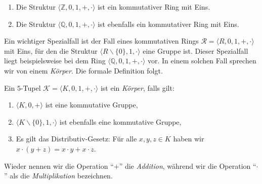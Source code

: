 \examples
\begin{enumerate}
\item Die Struktur $\langle \mathbb{Z}, 0, 1, +, \cdot \rangle$ ist ein kommutativer
      Ring mit  Eins.  
\item Die Struktur $\langle \mathbb{Q}, 0, 1, +, \cdot \rangle$ ist ebenfalls ein kommutativer Ring mit
      Eins.   \eoxs
\end{enumerate}

\begin{center}
\colorbox{red}{}
\end{center}

Ein wichtiger Spezialfall ist der Fall eines kommutativen Rings 
$\mathcal{R} = \langle R, 0, 1, +, \cdot \rangle$ mit Eins, 
f\"{u}r den die Struktur $\langle R \backslash \{0\}, 1, \cdot \rangle$
eine Gruppe ist.  Dieser Spezialfall liegt beispielsweise bei dem Ring  
$\langle \mathbb{Q}, 0, 1, +, \cdot \rangle$ vor.  In einem solchen Fall sprechen wir von einem {\color{blue}\emph{K\"{o}rper}}.  Die formale
Definition folgt.
\pagebreak


\begin{Definition}[K\"{o}rper]
Ein $5$-Tupel $\mathcal{K} = \langle K, 0, 1, +, \cdot \rangle$ ist ein {\color{blue}\emph{K\"{o}rper}}, falls gilt:
\begin{enumerate}
\item $\langle K, 0, + \rangle$ ist eine kommutative Gruppe,
\item $\langle K \backslash \{ 0 \}, 1, \cdot \rangle$ ist ebenfalls eine kommutative Gruppe,
\item Es gilt das Distributiv-Gesetz: F\"{u}r alle $x, y,z \in K$ haben wir
      \\[0.2cm]
      \hspace*{1.3cm} 
      $x \cdot (y + z) = x \cdot y + x \cdot z$.
\end{enumerate}
Wieder nennen wir die  Operation ``$+$'' die \emph{Addition}, w\"{a}hrend wir die Operation ``$\cdot$'' 
als die \emph{Multiplikation} bezeichnen. \eox
\end{Definition}

